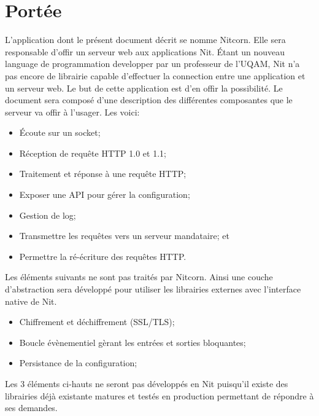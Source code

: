 \documentclass{scrreprt}
\begin{document}
\section{Portée}
L'application dont le présent document décrit se nomme Nitcorn. Elle sera responsable d'offir un serveur web aux applications Nit. Étant un nouveau language de programmation developper par un professeur de l'UQAM, Nit n'a pas encore de librairie capable d'effectuer la connection entre une application et un serveur web. Le but de cette application est d'en offir la possibilité. Le document sera composé d'une description des différentes composantes que le serveur va offir à l'usager. Les voici:
\begin{itemize}
    \item Écoute sur un socket;
    \item Réception de requête HTTP 1.0 et 1.1;
    \item Traitement et réponse à une requête HTTP;
    \item Exposer une API pour gérer la configuration;
    \item Gestion de log;
    \item Transmettre les requêtes vers un serveur mandataire; et
    \item Permettre la ré-écriture des requêtes HTTP.
\end{itemize}
Les éléments suivants ne sont pas traités par Nitcorn. Ainsi une couche
d'abstraction sera développé pour utiliser les librairies externes avec l'interface native de
Nit. 
\begin{itemize}
    \item Chiffrement et déchiffrement (SSL/TLS);
    \item Boucle évènementiel gèrant les entrées et sorties bloquantes; 
    \item Persistance de la configuration;
\end{itemize}

Les 3 éléments ci-hauts ne seront pas développés en Nit puisqu'il existe des
librairies déjà existante matures et testés en production permettant de répondre à ses demandes.
\end{document}
